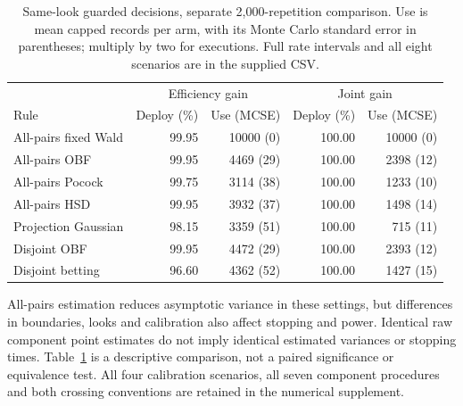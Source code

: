 \begin{table}[h]\centering\small
\caption{Same-look guarded decisions, separate 2,000-repetition comparison.
Use is mean capped records per arm, with its Monte Carlo standard error
in parentheses; multiply by two for executions. Full rate intervals and
all eight scenarios are in the supplied CSV.}
\label{tab:ustat_power}
\begin{tabular}{lrrrr}\toprule
 & \multicolumn{2}{c}{Efficiency gain} & \multicolumn{2}{c}{Joint gain}\\
Rule & Deploy (\%) & Use (MCSE) & Deploy (\%) & Use (MCSE)\\\midrule
All-pairs fixed Wald & 99.95 & 10000 (0) & 100.00 & 10000 (0) \\
All-pairs OBF & 99.95 & 4469 (29) & 100.00 & 2398 (12) \\
All-pairs Pocock & 99.75 & 3114 (38) & 100.00 & 1233 (10) \\
All-pairs HSD & 99.95 & 3932 (37) & 100.00 & 1498 (14) \\
Projection Gaussian & 98.15 & 3359 (51) & 100.00 & 715 (11) \\
Disjoint OBF & 99.95 & 4472 (29) & 100.00 & 2393 (12) \\
Disjoint betting & 96.60 & 4362 (52) & 100.00 & 1427 (15) \\
\bottomrule\end{tabular}\end{table}

All-pairs estimation reduces asymptotic variance in these settings,
but differences in boundaries, looks and calibration also affect stopping
and power. Identical raw component point estimates do not imply identical
estimated variances or stopping times. Table~\ref{tab:ustat_power} is a
descriptive comparison, not a paired significance or equivalence test.
All four calibration scenarios, all seven component procedures and both
crossing conventions are retained in the numerical supplement.
